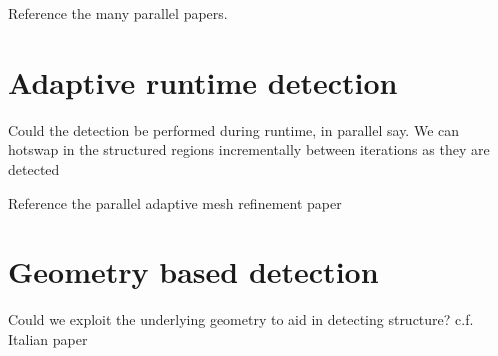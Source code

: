 Reference the many parallel papers.


\section{Adaptive runtime detection}
Could the detection be performed during runtime, in parallel say. We can hotswap in the structured regions incrementally between iterations as they are detected

Reference the parallel adaptive mesh refinement paper

\section{Geometry based detection}
Could we exploit the underlying geometry to aid in detecting structure?
c.f. Italian paper

